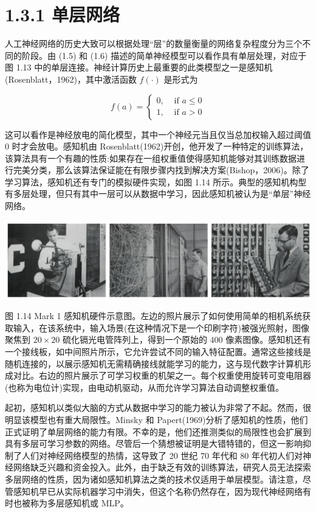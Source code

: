 \documentclass[10pt]{article}
\begin{document}
\section*{1.3.1 单层网络}

人工神经网络的历史大致可以根据处理“层”的数量衡量的网络复杂程度分为三个不同的阶段。由 (1.5) 和 (1.6) 描述的简单神经模型可以看作具有单层处理，对应于图 1.13 中的单层连接。神经计算历史上最重要的此类模型之一是感知机(Rosenblatt，1962)，其中激活函数 \(f\left( \cdot \right)\) 是形式为

\[
f\left( a\right)  = \left\{  \begin{array}{ll} 0, & \text{ if }a \leq  0 \\  1, & \text{ if }a > 0 \end{array}\right.  \tag{1.7}
\]

这可以看作是神经放电的简化模型，其中一个神经元当且仅当总加权输入超过阈值 0 时才会放电。感知机由 Rosenblatt(1962)开创，他开发了一种特定的训练算法，该算法具有一个有趣的性质:如果存在一组权重值使得感知机能够对其训练数据进行完美分类，那么该算法保证能在有限步骤内找到解决方案(Bishop，2006)。除了学习算法，感知机还有专门的模拟硬件实现，如图 1.14 所示。典型的感知机构型有多层处理，但只有其中一层可以从数据中学习，因此感知机被认为是“单层”神经网络。

\begin{center}
\includegraphics[max width=1.0\textwidth]{images/0194e279-9b28-703a-88f4-c3ac21e2010d_37_207_344_1342_344_0.jpg}
\end{center}
\hspace*{3em} 

图 1.14 Mark 1 感知机硬件示意图。左边的照片展示了如何使用简单的相机系统获取输入，在该系统中，输入场景(在这种情况下是一个印刷字符)被强光照射，图像聚焦到 \({20} \times  {20}\) 硫化镉光电管阵列上，得到一个原始的 400 像素图像。感知机还有一个接线板，如中间照片所示，它允许尝试不同的输入特征配置。通常这些接线是随机连接的，以展示感知机无需精确接线就能学习的能力，这与现代数字计算机形成对比。右边的照片展示了可学习权重的机架之一。每个权重使用旋转可变电阻器(也称为电位计)实现，由电动机驱动，从而允许学习算法自动调整权重值。

起初，感知机以类似大脑的方式从数据中学习的能力被认为非常了不起。然而，很明显该模型也有重大局限性。Minsky 和 Papert(1969)分析了感知机的性质，他们正式证明了单层网络的能力有限。不幸的是，他们还推测类似的局限性也会扩展到具有多层可学习参数的网络。尽管后一个猜想被证明是大错特错的，但这一影响抑制了人们对神经网络模型的热情，这导致了 20 世纪 70 年代和 80 年代初人们对神经网络缺乏兴趣和资金投入。此外，由于缺乏有效的训练算法，研究人员无法探索多层网络的性质，因为诸如感知机算法之类的技术仅适用于单层模型。请注意，尽管感知机早已从实际机器学习中消失，但这个名称仍然存在，因为现代神经网络有时也被称为多层感知机或 MLP。
\end{document}
